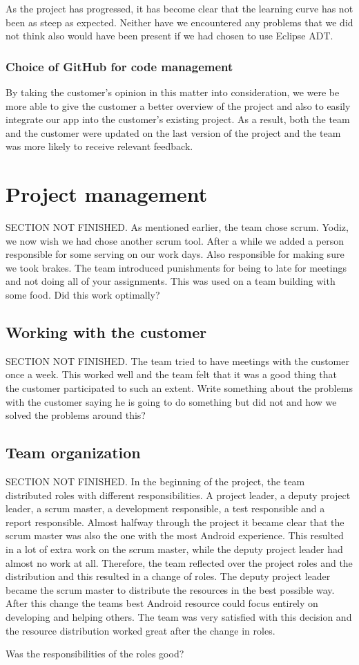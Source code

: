 As the project has progressed, it has become clear that the learning curve has not been as steep as expected. Neither have we encountered any problems that we did not think also would have been present if we had chosen to use Eclipse ADT.

\subsubsection{Choice of GitHub for code management}
By taking the customer's opinion in this matter into consideration, we were be more able to give the customer a better overview of the project and also to easily integrate our app into the customer's existing project. As a result, both the team and the customer were updated on the last version of the project and the team was more likely to receive relevant feedback. 

\section{Project management}
SECTION NOT FINISHED. As mentioned earlier, the team chose scrum. Yodiz, we now wish we had chose another scrum tool. After a while we added a person responsible for some serving on our work days. Also responsible for making sure we took brakes. 
The team introduced punishments for being to late for meetings and not doing all of your assignments. This was used on a team building with some food. Did this work optimally?
\subsection{Working with the customer}
SECTION NOT FINISHED. The team tried to have meetings with the customer once a week. This worked well and the team felt that it was a good thing that the customer participated to such an extent. Write something about the problems with the customer saying he is going to do something but did not and how we solved the problems around this?

\subsection{Team organization}
SECTION NOT FINISHED.
In the beginning of the project, the team distributed roles with different responsibilities. A project leader, a deputy project leader, a scrum master, a development responsible, a test responsible and a report responsible. Almost halfway through the project it became clear that the scrum master was also the one with the most Android experience. This resulted in a lot of extra work on the scrum master, while the deputy project leader had almost no work at all. Therefore, the team reflected over the project roles and the distribution and this resulted in a change of roles. The deputy project leader became the scrum master to distribute the resources in the best possible way. After this change the teams best Android resource could focus entirely on developing and helping others. The team was very satisfied with this decision and the resource distribution worked great after the change in roles. 

Was the responsibilities of the roles good?
